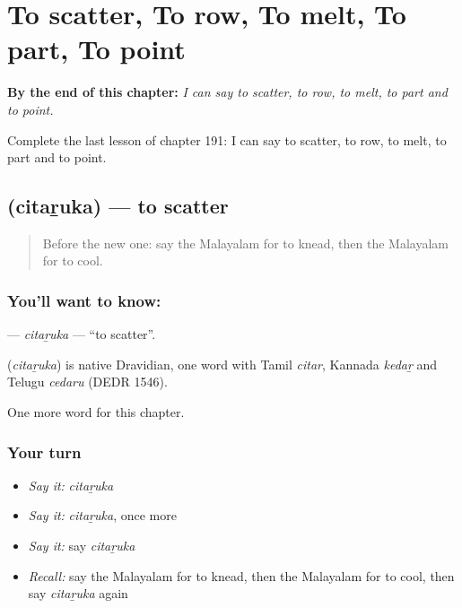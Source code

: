 
\chapter{To scatter, To row, To melt, To part, To point}
\label{ch:ml-to-scatter-to-row-to-melt-to-part-to-point}

\begin{chapteropening}
\textbf{By the end of this chapter:} \emph{I can say to scatter, to row, to melt, to part and to point.}

Complete the last lesson of chapter 191: I can say to scatter, to row, to melt, to part and to point.
\end{chapteropening}

\section[\texorpdfstring{\ml{ചിതറുക} (citaṟuka)}{ചിതറുക (citaṟuka)}]{ (citaṟuka) — to scatter}

\label{lesson:ML-C191-citaruka}



\begin{quote}
Before the new one: say the Malayalam for to knead, then the Malayalam for to cool.
\end{quote}

\subsection*{You'll want to know: }
\textbf{} — \emph{citaṟuka} — \textquotedblleft{}to scatter\textquotedblright{}.

\begin{cousinweb}
\textbf{} (\emph{citaṟuka}) is native Dravidian, one word with Tamil \emph{citar}, Kannada \emph{kedaṟ} and Telugu \emph{cedaru} (DEDR 1546).
\end{cousinweb}

\begin{grammarlens}[title={What you've built}]
One more word for this chapter.
\end{grammarlens}

\subsection*{Your turn}
\begin{itemize}
\raggedright
  \item \emph{Say it:} \emph{citaṟuka}
  \item \emph{Say it:} \emph{citaṟuka}, once more
  \item \emph{Say it:} say \emph{citaṟuka}
  \item \emph{Recall:} say the Malayalam for to knead, then the Malayalam for to cool, then say \emph{citaṟuka} again
\end{itemize}

